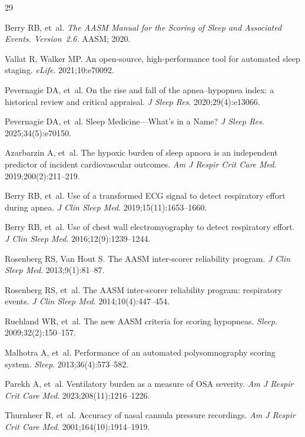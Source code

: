 \documentclass[11pt,a4paper]{article}
\begin{document}
\begin{thebibliography}{29}

Berry RB, et~al. \emph{The AASM Manual for the Scoring of Sleep and
Associated Events. Version~2.6.} AASM; 2020.

Vallat R, Walker MP. An open-source, high-performance tool for
automated sleep staging. \emph{eLife}. 2021;10:e70092.

Pevernagie DA, et~al. On the rise and fall of the apnea--hypopnea
index: a historical review and critical appraisal. \emph{J Sleep Res}.
2020;29(4):e13066.

Pevernagie DA, et~al. Sleep Medicine---What's in a Name?
\emph{J Sleep Res}. 2025;34(5):e70150.

Azarbarzin A, et~al. The hypoxic burden of sleep apnoea is an
independent predictor of incident cardiovascular outcomes.
\emph{Am J Respir Crit Care Med}. 2019;200(2):211--219.

Berry RB, et~al. Use of a transformed ECG signal to detect respiratory
effort during apnea. \emph{J Clin Sleep Med}. 2019;15(11):1653--1660.

Berry RB, et~al. Use of chest wall electromyography to detect
respiratory effort. \emph{J Clin Sleep Med}. 2016;12(9):1239--1244.

Rosenberg RS, Van Hout S. The AASM inter-scorer reliability program.
\emph{J Clin Sleep Med}. 2013;9(1):81--87.

Rosenberg RS, et~al. The AASM inter-scorer reliability program:
respiratory events. \emph{J Clin Sleep Med}. 2014;10(4):447--454.

Ruehland WR, et~al. The new AASM criteria for scoring hypopneas.
\emph{Sleep}. 2009;32(2):150--157.

Malhotra A, et~al. Performance of an automated polysomnography
scoring system. \emph{Sleep}. 2013;36(4):573--582.

Parekh A, et~al. Ventilatory burden as a measure of OSA severity.
\emph{Am J Respir Crit Care Med}. 2023;208(11):1216--1226.

Thurnheer R, et~al. Accuracy of nasal cannula pressure recordings.
\emph{Am J Respir Crit Care Med}. 2001;164(10):1914--1919.


\end{thebibliography}
\end{document}
